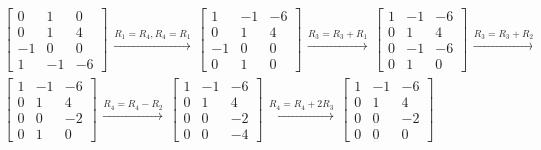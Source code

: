 \documentclass[11pt]{article}
\begin{document}
\begin{align*}
  \begin{bmatrix}
    0  & 1  & 0 \\
    0  & 1  & 4 \\
    -1 & 0  & 0 \\
    1  & -1 & -6
  \end{bmatrix}
  \begin{aligned} \xrightarrow{R_1 = R_4, R_4 = R_1} \end{aligned}
  \begin{bmatrix}
    1  & -1 & -6 \\
    0  & 1  & 4 \\
    -1 & 0  & 0 \\
    0  & 1  & 0
  \end{bmatrix}
  \begin{aligned} \xrightarrow{R_3 = R_3 + R_1} \end{aligned}
  \begin{bmatrix}
    1  & -1 & -6 \\
    0  & 1  & 4 \\
    0  & -1 & -6 \\
    0  & 1  & 0
  \end{bmatrix}
  \begin{aligned} \xrightarrow{R_3 = R_3 + R_2} \end{aligned} \\
  \begin{bmatrix}
    1  & -1 & -6 \\
    0  & 1  & 4 \\
    0  & 0  & -2 \\
    0  & 1  & 0
  \end{bmatrix}
  \begin{aligned} \xrightarrow{R_4 = R_4 - R_2} \end{aligned}
  \begin{bmatrix}
    1  & -1 & -6 \\
    0  & 1  & 4 \\
    0  & 0  & -2 \\
    0  & 0  & -4
  \end{bmatrix}
  \begin{aligned} \xrightarrow{R_4 = R_4 + 2R_3} \end{aligned}
  \begin{bmatrix}
    1  & -1 & -6 \\
    0  & 1  & 4 \\
    0  & 0  & -2 \\
    0  & 0  & 0
  \end{bmatrix}
\end{align*}
\end{document}
